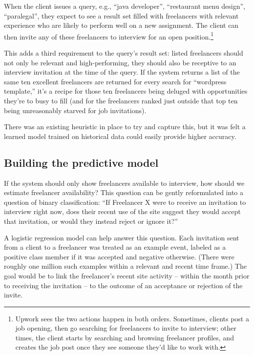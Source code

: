 \documentclass{article}
\begin{document}
 When the client issues a query, e.g., ``java developer'', ``restaurant menu
design'', ``paralegal'', they expect to see a result set filled with freelancers
with relevant experience who are likely to perform well on a new assignment. The
client can then invite any of these freelancers to interview for an open
position.\footnote{Upwork sees the two actions happen in both orders. Sometimes,
clients post a job opening, then go searching for freelancers to invite to
interview; other times, the client starts by searching and browsing freelancer
profiles, and creates the job post once they see someone they'd like to work
with.}

 This adds a third requirement to the query's result set: listed freelancers
should not only be relevant and high-performing, they should also be receptive
to an interview invitation at the time of the query. If the system returns a
list of the same ten excellent freelancers are returned for every search for
``wordpress template,'' it's a recipe for those ten freelancers being deluged
with opportunities they're to busy to fill (and for the freelancers ranked just
outside that top ten being unreasonably starved for job invitations).

 There was an existing heuristic in place to try and capture this, but it was
felt a learned model trained on historical data could easily provide higher
accuracy.

\subsection{Building the predictive model}

 If the system should only show freelancers available to interview, how should
we estimate freelancer availability? This question can be gently reformulated
into a question of binary classification: ``If Freelancer X were to receive an
invitation to interview right now, does their recent use of the site suggest
they would accept that invitation, or would they instead reject or ignore it?''

 A logistic regression model can help answer this question. Each invitation sent
from a client to a freelancer was treated as an example event, labeled as a
positive class member if it was accepted and negative otherwise. (There were
roughly one million such examples within a relevant and recent time frame.) The
goal would be to link the freelancer's recent site activity -- within the month
prior to receiving the invitation -- to the outcome of an acceptance or
rejection of the invite.
\end{document}
